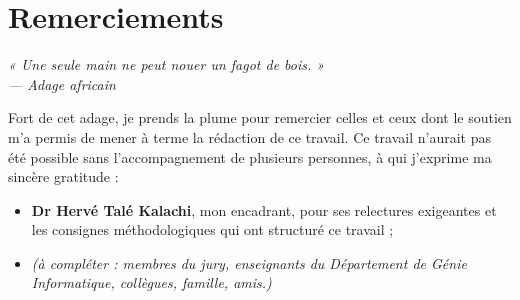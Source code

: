 \chapter*{Remerciements}
\label{chap:remerciements}
\begin{SingleSpace}
\begin{flushright}\itshape
« Une seule main ne peut nouer un fagot de bois. »\\
\upshape\small --- Adage africain
\end{flushright}
\vspace{0.5em}
Fort de cet adage, je prends la plume pour remercier celles et ceux dont le soutien m'a permis de mener à terme la rédaction de ce travail. Ce travail n'aurait pas été possible sans l'accompagnement de plusieurs personnes, à qui j'exprime ma sincère gratitude :
\begin{itemize}[label=, font=\large \color{darkblue}]
\item \textbf{Dr Hervé Talé Kalachi}, mon encadrant, pour ses relectures exigeantes et les consignes méthodologiques qui ont structuré ce travail ;
\item \emph{(à compléter : membres du jury, enseignants du Département de Génie Informatique, collègues, famille, amis.)}
\end{itemize}


\end{SingleSpace}
\clearpage
